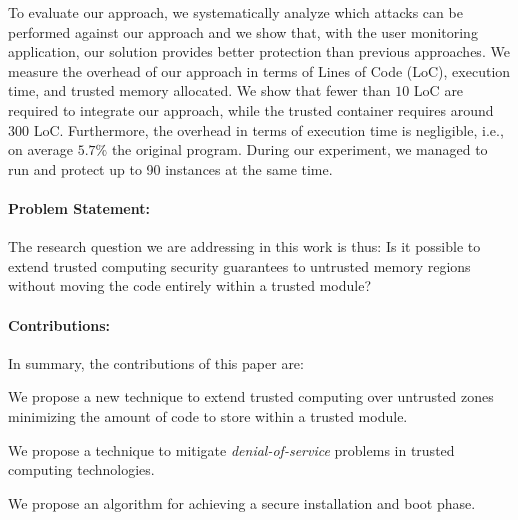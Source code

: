 To evaluate our approach, we systematically analyze which attacks can be 
performed against our approach and we show that, with the user monitoring 
application, our solution provides better protection than previous approaches. 
We measure the overhead of our approach in terms of Lines of Code (LoC), 
execution time, and trusted memory allocated. We 
show that fewer than $10$ LoC are required to 
integrate our approach, while the trusted container requires around $300$ LoC.
Furthermore, the overhead in terms of execution time is 
negligible, i.e., on average $5.7\%$ \wrt the original program.
During our experiment, we managed to run and protect up to 90 instances at the 
same time.

\vspace{-0.25cm}
\paragraph{\textbf{Problem Statement:}} 
The research question we are addressing in this work is thus: Is it possible 
to extend trusted computing security guarantees to untrusted memory regions 
without moving the code entirely within a trusted module?

\vspace{-0.25cm}
\paragraph{\textbf{Contributions:}}In summary, the contributions of this paper 
are:

\begin{enumerate*}[label=(\textbf{\alph*})]
	\item We propose a new technique to extend trusted computing over untrusted 
	zones minimizing the amount of code to store within a trusted module.
	\item We propose a technique to mitigate \emph{denial-of-service} problems 
	in trusted computing technologies.
	\item We propose an algorithm for achieving a secure installation and boot 
	phase.
\end{enumerate*}

